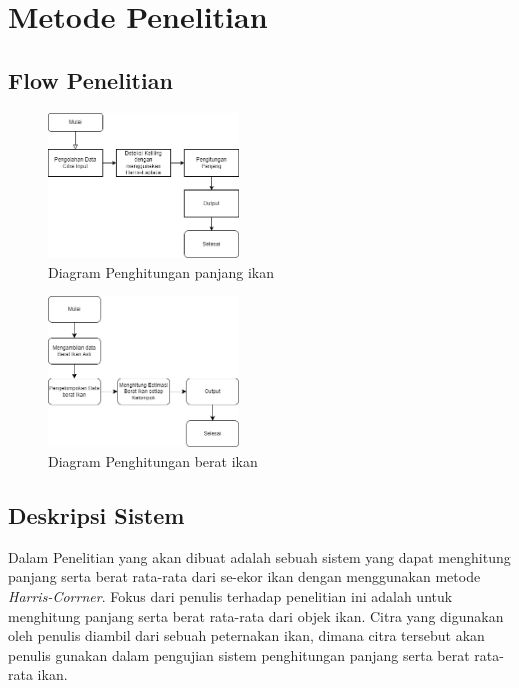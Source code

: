 
\chapter{Metode Penelitian}

\section{Flow Penelitian}

\begin{figure}
  \centering{}
  \includegraphics[width=0.45\textwidth]{gambar/Flowchart Penelitian.png}
  \caption{Diagram Penghitungan panjang ikan}
\end{figure}

\begin{figure}
  \centering{}
  \includegraphics[width=0.45\textwidth]{gambar/Penghitungan Berat.png}
  \caption{Diagram Penghitungan berat ikan}
\end{figure}

\section{Deskripsi Sistem}

Dalam Penelitian yang akan dibuat adalah sebuah sistem yang dapat menghitung panjang serta berat rata-rata dari se-ekor ikan dengan menggunakan metode \emph{Harris-Corrner}.
Fokus dari penulis terhadap penelitian ini adalah untuk menghitung panjang serta berat rata-rata dari objek ikan. 
Citra yang digunakan oleh penulis diambil dari sebuah peternakan ikan, dimana citra tersebut akan penulis gunakan dalam pengujian sistem penghitungan panjang serta berat rata-rata ikan.


